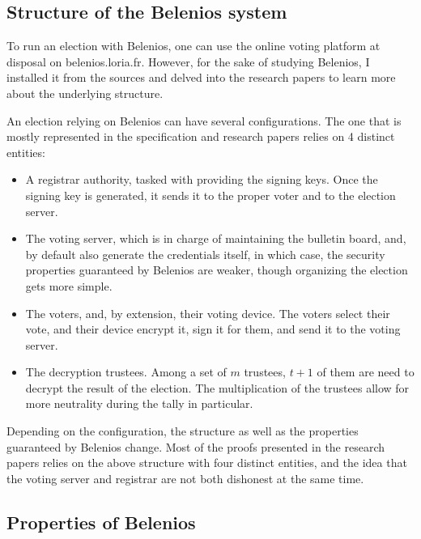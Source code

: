 \documentclass[12pt, a4paper]{report}
\begin{document}
\subsection{Structure of the Belenios system}

To run an election with Belenios, one can use the online voting platform at disposal on belenios.loria.fr. However, for the sake of studying Belenios, I installed it from the sources and delved into the research papers to learn more about the underlying structure. \cite{BOOK:1} \cite{WEBSITE:1}

An election relying on Belenios can have several configurations. The one that is mostly represented in the specification and research papers relies on 4 distinct entities:

\begin{itemize}
\item A registrar authority, tasked with providing the signing keys. Once the signing key is generated, it sends it to the proper voter and to the election server.\cite{BOOK:1}

\item The voting server, which is in charge of maintaining the bulletin board, and, by default also generate the credentials itself, in which case, the security properties guaranteed by Belenios are weaker, though organizing the election gets more simple. \cite{BOOK:1}

\item The voters, and, by extension, their voting device. The voters select their vote, and their device encrypt it, sign it for them, and send it to the voting server. \cite{BOOK:1}

\item The decryption trustees. Among a set of $m$ trustees, $t + 1$ of them are need to decrypt the result of the election. The multiplication of the trustees allow for more neutrality during the tally in particular. \cite{BOOK:1}
 \end{itemize}

Depending on the configuration, the structure as well as the properties guaranteed by Belenios change. Most of the proofs presented in the research papers relies on the above structure with four distinct entities, and the idea that the voting server and registrar are not both dishonest at the same time.


\subsection{Properties of Belenios}
\end{document}
